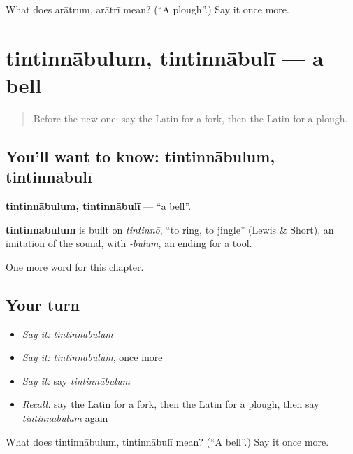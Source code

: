\begin{tcolorbox}[breakable,colback=teal!4,colframe=teal!35!black,title={Before you move on}]
What does arātrum, arātrī mean? (\textquotedblleft{}A plough\textquotedblright{}.) Say it once more.
\end{tcolorbox}
\section[tintinnābulum, tintinnābulī]{tintinnābulum, tintinnābulī — a bell}

\label{lesson:LA-C142-tintinnabulum}



\begin{quote}
Before the new one: say the Latin for a fork, then the Latin for a plough.
\end{quote}

\subsection*{You'll want to know: tintinnābulum, tintinnābulī}
\textbf{tintinnābulum, tintinnābulī} — \textquotedblleft{}a bell\textquotedblright{}.

\begin{cousinweb}
\textbf{tintinnābulum} is built on \emph{tintinnō}, \textquotedblleft{}to ring, to jingle\textquotedblright{} (Lewis \& Short), an imitation of the sound, with \emph{-bulum}, an ending for a tool.
\end{cousinweb}

\begin{grammarlens}[title={What you've built}]
One more word for this chapter.
\end{grammarlens}

\subsection*{Your turn}
\begin{itemize}
\raggedright
  \item \emph{Say it:} \emph{tintinnābulum}
  \item \emph{Say it:} \emph{tintinnābulum}, once more
  \item \emph{Say it:} say \emph{tintinnābulum}
  \item \emph{Recall:} say the Latin for a fork, then the Latin for a plough, then say \emph{tintinnābulum} again
\end{itemize}

\begin{tcolorbox}[breakable,colback=teal!4,colframe=teal!35!black,title={Before you move on}]
What does tintinnābulum, tintinnābulī mean? (\textquotedblleft{}A bell\textquotedblright{}.) Say it once more.
\end{tcolorbox}
